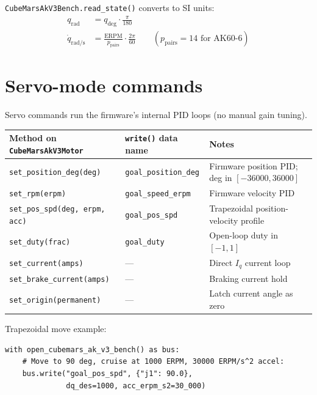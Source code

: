 \documentclass[11pt,a4paper]{article}
\begin{document}
\texttt{CubeMarsAkV3Bench.read\_state()} converts to SI units:
\begin{align}
  q_{\text{rad}} &= q_{\deg} \cdot \tfrac{\pi}{180} \label{eq:deg2rad} \\
  \dot{q}_{\text{rad/s}} &= \frac{\text{ERPM}}{p_\text{pairs}} \cdot \frac{2\pi}{60}
  \qquad (p_\text{pairs} = 14 \text{ for AK60-6})
  \label{eq:erpm2rads}
\end{align}

\section{Servo-mode commands}
\label{sec:servo}

Servo commands run the firmware's internal PID loops (no manual gain tuning).

\begin{center}\small
\begin{tabular}{lll}
\toprule
Method on \texttt{CubeMarsAkV3Motor} & \texttt{write()} data name & Notes \\
\midrule
\texttt{set\_position\_deg(deg)} & \texttt{goal\_position\_deg}
  & Firmware position PID; deg in $[-36000, 36000]$ \\
\texttt{set\_rpm(erpm)} & \texttt{goal\_speed\_erpm}
  & Firmware velocity PID \\
\texttt{set\_pos\_spd(deg, erpm, acc)} & \texttt{goal\_pos\_spd}
  & Trapezoidal position-velocity profile \\
\texttt{set\_duty(frac)} & \texttt{goal\_duty}
  & Open-loop duty in $[-1, 1]$ \\
\texttt{set\_current(amps)} & ---
  & Direct $I_q$ current loop \\
\texttt{set\_brake\_current(amps)} & ---
  & Braking current hold \\
\texttt{set\_origin(permanent)} & ---
  & Latch current angle as zero \\
\bottomrule
\end{tabular}
\end{center}

Trapezoidal move example:
\begin{lstlisting}
with open_cubemars_ak_v3_bench() as bus:
    # Move to 90 deg, cruise at 1000 ERPM, 30000 ERPM/s^2 accel:
    bus.write("goal_pos_spd", {"j1": 90.0},
              dq_des=1000, acc_erpm_s2=30_000)
\end{lstlisting}
\end{document}
